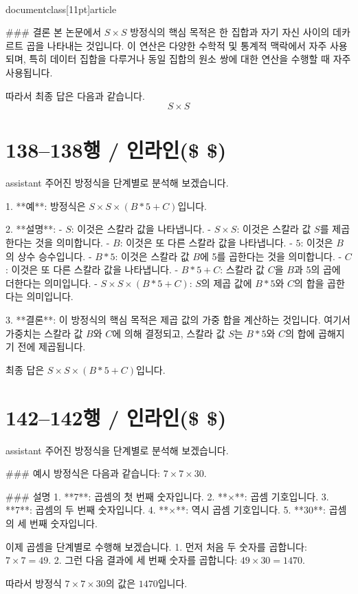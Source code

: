 \\documentclass[11pt]{article}
\begin{document}
### 결론
본 논문에서 \( S \times S \) 방정식의 핵심 목적은 한 집합과 자기 자신 사이의 데카르트 곱을 나타내는 것입니다. 이 연산은 다양한 수학적 및 통계적 맥락에서 자주 사용되며, 특히 데이터 집합을 다루거나 동일 집합의 원소 쌍에 대한 연산을 수행할 때 자주 사용됩니다.

따라서 최종 답은 다음과 같습니다.
\[ \boxed{S \times S} \]

\section*{138–138행 / 인라인(\$ \$) }
assistant
주어진 방정식을 단계별로 분석해 보겠습니다.

1. **예**: 방정식은 \( S \times S \times (B*5 + C) \)입니다.

2. **설명**:
- \( S \): 이것은 스칼라 값을 나타냅니다.
- \( S \times S \): 이것은 스칼라 값 \( S \)를 제곱한다는 것을 의미합니다.
- \( B \): 이것은 또 다른 스칼라 값을 나타냅니다.
- \( 5 \): 이것은 \( B \)의 상수 승수입니다.
- \( B*5 \): 이것은 스칼라 값 \( B \)에 5를 곱한다는 것을 의미합니다.
- \( C \): 이것은 또 다른 스칼라 값을 나타냅니다.
- \( B*5 + C \): 스칼라 값 \( C \)을 \( B \)과 5의 곱에 더한다는 의미입니다.
- \( S \times S \times (B*5 + C) \): \( S \)의 제곱 값에 \( B*5 \)와 \( C \)의 합을 곱한다는 의미입니다.

3. **결론**: 이 방정식의 핵심 목적은 제곱 값의 가중 합을 계산하는 것입니다. 여기서 가중치는 스칼라 값 \( B \)와 \( C \)에 의해 결정되고, 스칼라 값 \( S \)는 \( B*5 \)와 \( C \)의 합에 곱해지기 전에 제곱됩니다.

최종 답은 \(\boxed{S \times S \times (B*5 + C)}\)입니다.

\section*{142–142행 / 인라인(\$ \$) }
assistant
주어진 방정식을 단계별로 분석해 보겠습니다.

### 예시
방정식은 다음과 같습니다: \(7 \times 7 \times 30\).

### 설명
1. **7**: 곱셈의 첫 번째 숫자입니다.
2. **×**: 곱셈 기호입니다.
3. **7**: 곱셈의 두 번째 숫자입니다.
4. **×**: 역시 곱셈 기호입니다.
5. **30**: 곱셈의 세 번째 숫자입니다.

이제 곱셈을 단계별로 수행해 보겠습니다.
1. 먼저 처음 두 숫자를 곱합니다: \(7 \times 7 = 49\).
2. 그런 다음 결과에 세 번째 숫자를 곱합니다: \(49 \times 30 = 1470\).

따라서 방정식 \(7 \times 7 \times 30\)의 값은 \(1470\)입니다.
\end{document}
